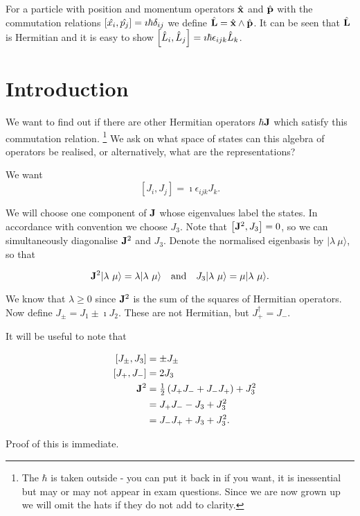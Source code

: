 \documentclass{notes}
\newcommand{\ket}[1]{|#1\rangle}
\newcommand{\com}[2]{\left[#1,#2\right]}
\begin{document}
For a particle with position and momentum operators $\Hat{\mathbf{x}}$
and $\Hat{\mathbf{p}}$ with the commutation relations
$\com{\Hat{x_i}}{\Hat{p_j}} = \imath \hbar \delta_{i j}$ we define
$\Hat{\mathbf{L}} = \Hat{\mathbf{x}} \wedge \Hat{\mathbf{p}}$.  It can
be seen that $\Hat{\mathbf{L}}$ is Hermitian and it is easy to show
$\com{\Hat{L}_i}{\Hat{L}_j} = \imath \hbar \epsilon_{i j k}
\Hat{L}_k$.

\section{Introduction}

We want to find out if there are other Hermitian operators $\hbar
\mathbf{J}$ which satisfy this commutation relation.%
\footnote{The $\hbar$ is taken outside - you can put it back in if you
  want, it is inessential but may or may not appear in exam questions.
  Since we are now grown up we will omit the hats if they do not add
  to clarity.}  We ask on what space of states can this algebra of
operators be realised, or alternatively, what are the representations?

We want
\[
\com{J_i}{J_j} = \imath \epsilon_{ijk} J_k.
\]

We will choose one component of $\mathbf{J}$ whose eigenvalues label the
states.  In accordance with convention we choose $J_3$.  Note that
$\com{\vect{J}^2}{J_3} = 0$, so we can simultaneously diagonalise
$\mathbf{J}^2$ and $J_3$.  Denote the normalised eigenbasis by
$\ket{\lambda\ \mu}$, so that

\[
\vect{J}^2 \ket{\lambda\ \mu} = \lambda \ket{\lambda\ \mu} \quad
\text{and}
\quad J_3 \ket{\lambda\ \mu} = \mu \ket{\lambda\ \mu}.
\]

We know that $\lambda \ge 0$ since $\mathbf{J}^2$ is the sum of the
squares of Hermitian operators.  Now define $J_\pm = J_1 \pm \imath
J_2$.  These are not Hermitian, but $J_+^\dag = J_-$.

It will be useful to note that

\begin{align*}
\com{J_\pm}{J_3} &= \pm J_\pm\\
\quad \com{J_+}{J_-} & = 2 J_3\\
\vect{J}^2 &= \tfrac{1}{2} \left(J_+ J_- + J_- J_+\right) + J_3^2 \\
&= J_+ J_- - J_3 + J_3^2 \\
&= J_- J_+ + J_3 + J_3^2. 
\end{align*}

Proof of this is immediate.
\end{document}
